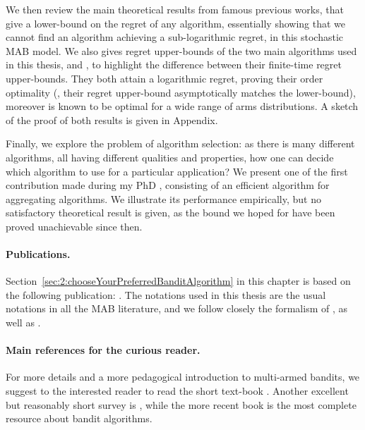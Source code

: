 We then review the main theoretical results from famous previous works, that give a lower-bound on the regret of any algorithm, essentially showing that we cannot find an algorithm achieving a sub-logarithmic regret, in this stochastic MAB model.
We also gives regret upper-bounds of the two main algorithms used in this thesis, \UCB{} and \klUCB, to highlight the difference between their finite-time regret upper-bounds. They both attain a logarithmic regret, proving their order optimality (\ie, their regret upper-bound asymptotically matches the lower-bound), moreover \klUCB{} is known to be optimal for a wide range of arms distributions.
A sketch of the proof of both results is given in Appendix.

Finally, we explore the problem of algorithm selection: as there is many different algorithms, all having different qualities and properties, how one can decide which algorithm to use for a particular application?
We present one of the first contribution made during my PhD \cite{Besson2018WCNC}, consisting of an efficient algorithm for aggregating algorithms. We illustrate its performance empirically, but no satisfactory theoretical result is given, as the bound we hoped for have been proved unachievable since then.


\paragraph{Publications.}
%
Section~\ref{sec:2:chooseYourPreferredBanditAlgorithm} in this chapter is based on the following publication: \cite{Besson2018WCNC}.
The notations used in this thesis are the usual notations in all the MAB literature, and we follow closely the formalism of \cite{Kaufmann12PhD}, as well as \cite{Slivkins2019,LattimoreBanditAlgorithmsBook,Bubeck12}.


\paragraph{Main references for the curious reader.}
%
For more details and a more pedagogical introduction to multi-armed bandits, we suggest to the interested reader to read the short text-book \cite{Slivkins2019}.
Another excellent but reasonably short survey is \cite{Bubeck12}, while the more recent book \cite{LattimoreBanditAlgorithmsBook} is the most complete resource about bandit algorithms.


\newpage
\graphicspath{{2-Chapters/2-Chapter/Images/}}

